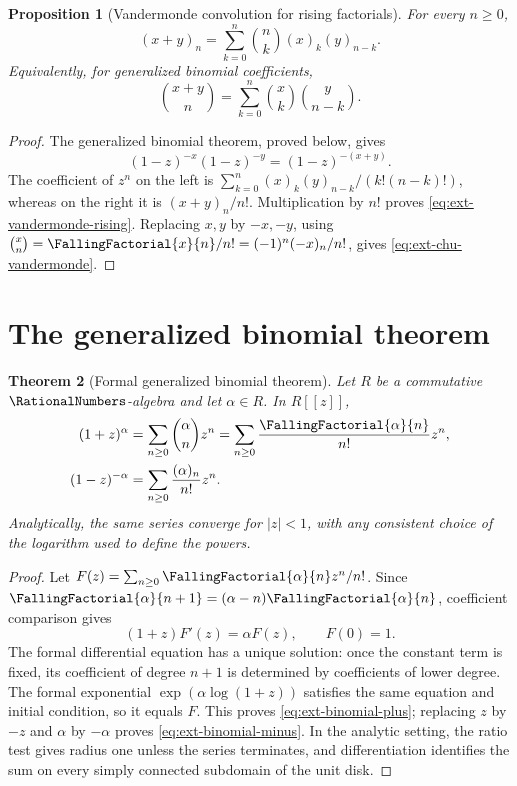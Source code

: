 \documentclass[11pt,a4paper,oneside,openany]{book}
\newtheorem{theorem}{Theorem}[chapter]
\newtheorem{proposition}[theorem]{Proposition}
\theoremstyle{definition}
\theoremstyle{remark}
\begin{document}
\begin{proposition}[Vandermonde convolution for rising factorials]
For every \(n\ge0\),
\begin{equation}\label{eq:ext-vandermonde-rising}
 (x+y)_n=\sum_{k=0}^n\binom nk(x)_k(y)_{n-k}.
\end{equation}
Equivalently, for generalized binomial coefficients,
\begin{equation}\label{eq:ext-chu-vandermonde}
 \binom{x+y}{n}=\sum_{k=0}^n\binom{x}{k}\binom{y}{n-k}.
\end{equation}
\end{proposition}
\begin{proof}
The generalized binomial theorem, proved below, gives
\[
 (1-z)^{-x}(1-z)^{-y}=(1-z)^{-(x+y)}.
\]
The coefficient of \(z^n\) on the left is
\(\sum_{k=0}^n(x)_k(y)_{n-k}/(k!(n-k)!)\), whereas on the right it is
\((x+y)_n/n!\).  Multiplication by \(n!\) proves
\eqref{eq:ext-vandermonde-rising}.  Replacing \(x,y\) by \(-x,-y\), using
\(\binom{x}{n}=\FallingFactorial{x}{n}/n!=(-1)^n(-x)_n/n!\), gives
\eqref{eq:ext-chu-vandermonde}.
\end{proof}

\section{The generalized binomial theorem}

\begin{theorem}[Formal generalized binomial theorem]
Let \(R\) be a commutative \(\RationalNumbers\)-algebra and let \(\alpha\in R\).  In
\(R[[z]]\),
\begin{align}
 (1+z)^\alpha
 &=\sum_{n\ge0}\binom{\alpha}{n}z^n
 =\sum_{n\ge0}\frac{\FallingFactorial{\alpha}{n}}{n!}z^n,\label{eq:ext-binomial-plus}\\
 (1-z)^{-\alpha}
 &=\sum_{n\ge0}\frac{(\alpha)_n}{n!}z^n.\label{eq:ext-binomial-minus}
\end{align}
Analytically, the same series converge for \(|z|<1\), with any consistent
choice of the logarithm used to define the powers.
\end{theorem}
\begin{proof}
Let
\(F(z)=\sum_{n\ge0}\FallingFactorial{\alpha}{n}z^n/n!\).  Since
\(\FallingFactorial{\alpha}{n+1}=(\alpha-n)\FallingFactorial{\alpha}{n}\), coefficient
comparison gives
\[
 (1+z)F'(z)=\alpha F(z),\qquad F(0)=1.
\]
The formal differential equation has a unique solution: once the constant term
is fixed, its coefficient of degree \(n+1\) is determined by coefficients of
lower degree.  The formal exponential
\(\exp(\alpha\log(1+z))\) satisfies the same equation and initial condition,
so it equals \(F\).  This proves \eqref{eq:ext-binomial-plus}; replacing
\(z\) by \(-z\) and \(\alpha\) by \(-\alpha\) proves
\eqref{eq:ext-binomial-minus}.  In the analytic setting, the ratio test gives
radius one unless the series terminates, and differentiation identifies the
sum on every simply connected subdomain of the unit disk.
\end{proof}
\end{document}
